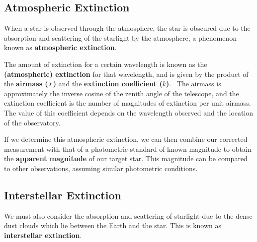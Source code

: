 
\subsection{Atmospheric Extinction}
\label{cha:InfraredDataReductionTechniques:sec:MagnitudeScale:subsec:AtmosphericExtinction}

When a star is observed through the atmosphere, the star is obscured
due to the absorption and scattering of the starlight by the
atmosphere, a phenomenon known as \textbf{atmospheric extinction}. %

\vspace{\myparskip}

The amount of extinction for a certain wavelength is known as the \textbf{(atmospheric) extinction} %
for that wavelength, and is given by the product of the
\textbf{airmass ($\Chi$)} %
\label{cha:InfraredDataReductionTechniques:sec:MagnitudeScale:subsec:AtmosphericExtinction:topic:k}
and the \textbf{extinction coefficient ($k$)}.%
\ The airmass is approximately the inverse cosine of the zenith angle of
the telescope, and the extinction coefficient is the number of
magnitudes of extinction per unit airmass. The value of this coefficient depends on
the wavelength observed and the location of the observatory. %

\vspace{\myparskip}

If we determine this atmospheric extinction, we can then combine our corrected measurement with that of a photometric standard of known magnitude to obtain the \textbf{apparent
magnitude} %
of our target star. This magnitude can be compared to other observations, assuming similar photometric conditions. %


\subsection{Interstellar Extinction}
\label{cha:InfraredDataReductionTechniques:sec:MagnitudeScale:subsec:InterstellarExtinction}

We must also consider the absorption and scattering of starlight due to the
dense dust clouds which lie between the Earth and the star. This is
known as \textbf{interstellar extinction}. %

\vspace{\myparskip}


